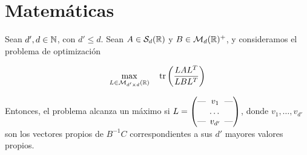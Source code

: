 \documentclass{book}
\begin{document}


\setcounter{tocdepth}{1}

\thispagestyle{plain}
\tableofcontents
\vspace*{\fill}
\doclicenseThis
\newpage
\thispagestyle{plain}


\part{Matemáticas}


\begin{comment}
\begin{prop}[Caracterizaciones de distancias asociadas a métricas] \label{prop:caract_distancias}
	
\end{prop}
\end{comment}



\begin{thm} \label{thm:eigen_trace_ratio_opt}
	Sean $d',d \in \mathbb{N} $, con $d' \le d$. Sean $A \in \mathcal{S}_d(\mathbb{R})$ y $B \in \mathcal{M}_d(\mathbb{R})^+$, y consideramos el problema de optimización
	
	\begin{align*}
	\max_{L \in \mathcal{M}_{d'\times d}(\mathbb{R})} &\quad \operatorname{tr}\left(\frac{LAL^T}{LBL^T}\right)  \\
	\end{align*}
	
	Entonces, el problema alcanza un máximo si $L = \begin{pmatrix}
	\text{---} \hspace{-0.2cm} & v_1 & \hspace{-0.2cm} \text{---} \\
	& \dots &  \\
	\text{---} \hspace{-0.2cm} & v_{d'} & \hspace{-0.2cm} \text{---}
	\end{pmatrix}$, donde $v_1,\dots,v_{d'}$ son los vectores propios de $B^{-1}C$ correspondientes a sus $d'$ mayores valores propios.
	
	
\end{thm}
\end{document}
